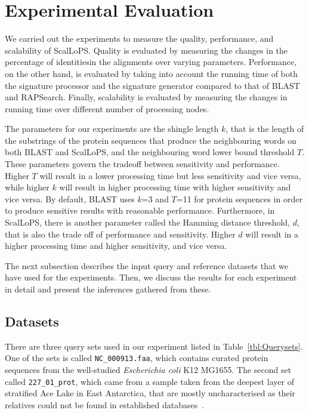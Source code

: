 \documentclass[titlepage]{csetr}
\begin{document}
\section{Experimental Evaluation}
\label{sec:Evaluation}
We carried out the experiments to measure the quality, performance, and scalability of ScalLoPS. Quality is evaluated by measuring the changes in the percentage of identitiesin the alignments over varying parameters. Performance, on the other hand, is evaluated by taking into account the running time of both the signature processor and the signature generator compared to that of BLAST and RAPSearch. Finally, scalability is evaluated by measuring the changes in running time over different number of processing nodes.

The parameters for our experiments are the shingle length $k$, that is the length of the substrings of the protein sequences that produce the neighbouring words on both BLAST and ScalLoPS, and the neighbouring word lower bound threshold $T$. These parameters govern the tradeoff between sensitivity and performance. Higher $T$ will result in a lower processing time but less sensitivity and vice versa, while higher $k$ will result in higher processing time with higher sensitivity and vice versa. By default, BLAST uses $k$=3 and $T$=11 for protein sequences in order to produce sensitive results with reasonable performance. Furthermore, in ScalLoPS, there is another parameter called the Hamming distance threshold, $d$, that is also the trade off of performance and sensitivity. Higher $d$ will result in a higher processing time and higher sensitivity, and vice versa.

The next subsection describes the input query and reference datasets that we have used for the experiments. Then, we discuss the results for each experiment in detail and present the inferences gathered from these.

\subsection{Datasets}

There are three query sets used in our experiment listed in Table~\ref{tbl:Querysets}. One of the sets is called \texttt{NC\_000913.faa}, which contains curated protein sequences from the well-studied \emph{Escherichia coli} K12 MG1655. The second set called \texttt{227\_01\_prot}, which came from a sample taken from the deepest layer of stratified Ace Lake in East Antarctica, that are mostly uncharacterised as their relatives could not be found in established databases~\cite{227}.
\end{document}
